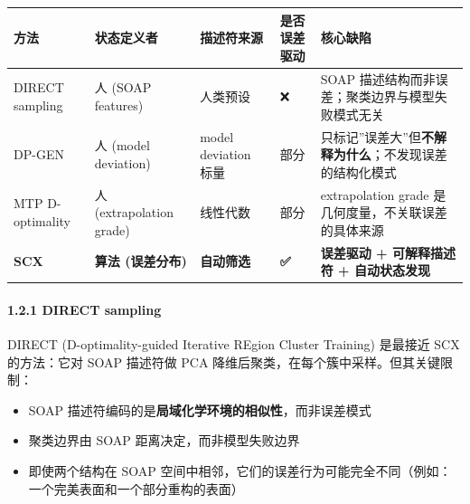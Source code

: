 \documentclass[
  12pt,
]{ctexart}
\providecommand{\tightlist}{%
  \setlength{\itemsep}{0pt}\setlength{\parskip}{0pt}}
\begin{document}
\begin{longtable}[]{@{}
  >{\raggedright\arraybackslash}p{}
  >{\raggedright\arraybackslash}p{}
  >{\raggedright\arraybackslash}p{}
  >{\raggedright\arraybackslash}p{}
  >{\raggedright\arraybackslash}p{}@{}}
\toprule\noalign{}
\begin{minipage}[b]{\linewidth}\raggedright
方法
\end{minipage} & \begin{minipage}[b]{\linewidth}\raggedright
状态定义者
\end{minipage} & \begin{minipage}[b]{\linewidth}\raggedright
描述符来源
\end{minipage} & \begin{minipage}[b]{\linewidth}\raggedright
是否误差驱动
\end{minipage} & \begin{minipage}[b]{\linewidth}\raggedright
核心缺陷
\end{minipage} \\
\midrule\noalign{}
\endhead
\bottomrule\noalign{}
\endlastfoot
DIRECT sampling & 人 (SOAP features) & 人类预设 & ❌ & SOAP
描述结构而非误差；聚类边界与模型失败模式无关 \\
DP-GEN & 人 (model deviation) & model deviation 标量 & 部分 &
只标记''误差大''但\textbf{不解释为什么}；不发现误差的结构化模式 \\
MTP D-optimality & 人 (extrapolation grade) & 线性代数 & 部分 &
extrapolation grade 是几何度量，不关联误差的具体来源 \\
\textbf{SCX} & \textbf{算法 (误差分布)} & \textbf{自动筛选} &
\textbf{✅} & \textbf{误差驱动 + 可解释描述符 + 自动状态发现} \\
\end{longtable}

\paragraph{1.2.1 DIRECT sampling}\label{direct-sampling}

DIRECT (D-optimality-guided Iterative REgion Cluster Training) 是最接近
SCX 的方法：它对 SOAP 描述符做 PCA
降维后聚类，在每个簇中采样。但其关键限制：

\begin{itemize}
\tightlist
\item
  SOAP 描述符编码的是\textbf{局域化学环境的相似性}，而非误差模式
\item
  聚类边界由 SOAP 距离决定，而非模型失败边界
\item
  即使两个结构在 SOAP
  空间中相邻，它们的误差行为可能完全不同（例如：一个完美表面和一个部分重构的表面）
\end{itemize}
\end{document}

